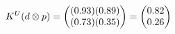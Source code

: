 \documentclass[preview]{standalone}
\begin{document}
\begin{align*}
\special{dvisvgm:raw <g id='unique000'>}K^U(d \otimes p) = \begin{pmatrix} (0.93)(0.89) \\ (0.73)(0.35) \end{pmatrix} = \begin{pmatrix} 0.82 \\ 0.26 \end{pmatrix}\special{dvisvgm:raw </g>}
\end{align*}
\end{document}
